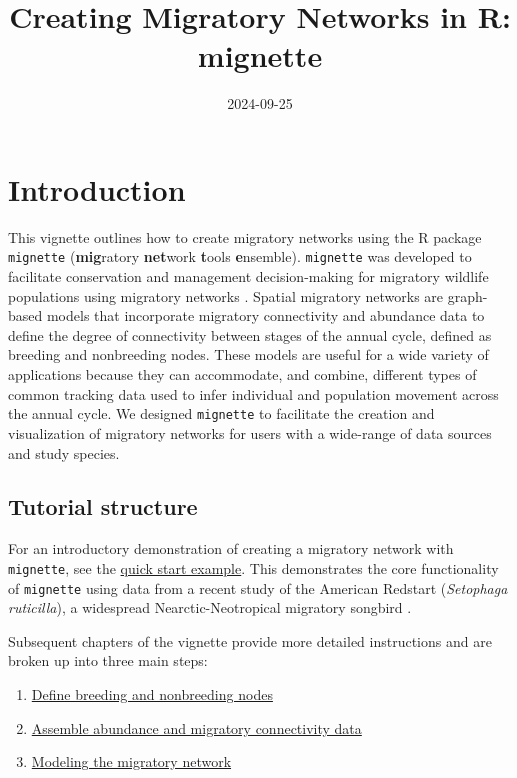 \documentclass[
]{book}
\title{Creating Migratory Networks in R: mignette}
\author{}
\date{\vspace{-2.5em}2024-09-25}
\providecommand{\tightlist}{%
  \setlength{\itemsep}{0pt}\setlength{\parskip}{0pt}}
\begin{document}
\maketitle

{
\setcounter{tocdepth}{1}
\tableofcontents
}
\hypertarget{introduction}{%
\chapter{Introduction}\label{introduction}}

This vignette outlines how to create migratory networks using the R package \texttt{mignette} (\textbf{mig}ratory \textbf{net}work \textbf{t}ools \textbf{e}nsemble). \texttt{mignette} was developed to facilitate conservation and management decision-making for migratory wildlife populations using migratory networks \citep{ruegg2020genoscape, taylor2010population}. Spatial migratory networks are graph-based models that incorporate migratory connectivity and abundance data to define the degree of connectivity between stages of the annual cycle, defined as breeding and nonbreeding nodes. These models are useful for a wide variety of applications because they can accommodate, and combine, different types of common tracking data used to infer individual and population movement across the annual cycle. We designed \texttt{mignette} to facilitate the creation and visualization of migratory networks for users with a wide-range of data sources and study species.

\hypertarget{tutorial-structure}{%
\section{Tutorial structure}\label{tutorial-structure}}

For an introductory demonstration of creating a migratory network with \texttt{mignette}, see the \protect\hyperlink{quickstart}{quick start example}. This demonstrates the core functionality of \texttt{mignette} using data from a recent study of the American Redstart (\emph{Setophaga ruticilla}), a widespread Nearctic-Neotropical migratory songbird \citep{desaix2023low}.

Subsequent chapters of the vignette provide more detailed instructions and are broken up into three main steps:

\begin{enumerate}
\def\labelenumi{\arabic{enumi}.}
\tightlist
\item
  \protect\hyperlink{nodes}{Define breeding and nonbreeding nodes}
\item
  \protect\hyperlink{data}{Assemble abundance and migratory connectivity data}
\item
  \protect\hyperlink{model}{Modeling the migratory network}
\end{enumerate}
\end{document}
